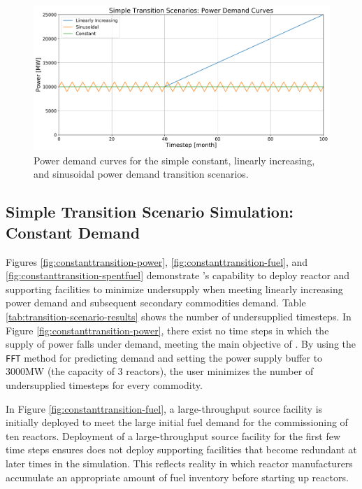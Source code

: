     \begin{figure}[]
        \begin{center}
            \includegraphics[scale=0.45]{./figures/powerplots.png}
        \end{center}
            \caption{Power demand curves for the simple constant, 
            linearly increasing, and sinusoidal power demand 
            transition scenarios.}
        \label{fig:powerplots}
    \end{figure}

\subsection{Simple Transition Scenario Simulation: Constant Demand}
Figures \ref{fig:constanttransition-power}, \ref{fig:constanttransition-fuel},
and \ref{fig:constanttransition-spentfuel} demonstrate \deploy's capability 
to deploy reactor and supporting facilities to minimize undersupply 
when meeting linearly increasing power demand and subsequent secondary 
commodities demand.  
Table \ref{tab:transition-scenario-results} shows the number of 
undersupplied timesteps. 
In Figure \ref{fig:constanttransition-power}, there exist no time steps 
in which the supply of power falls under demand, meeting the main 
objective of \deploy. 
By using the \texttt{FFT} method for 
predicting demand and setting the power supply buffer to 3000MW 
(the capacity of 3 reactors), the user minimizes the number of 
undersupplied timesteps for every commodity.

In Figure \ref{fig:constanttransition-fuel},
a large-throughput source facility is initially
deployed to meet the large initial fuel demand for the commissioning 
of ten reactors. 
Deployment of a large-throughput source facility for the 
first few time steps ensures \deploy does not deploy supporting
facilities that become redundant at later times in  
the simulation.
This reflects reality in which reactor manufacturers accumulate
an appropriate amount of fuel inventory before starting 
up reactors. 

